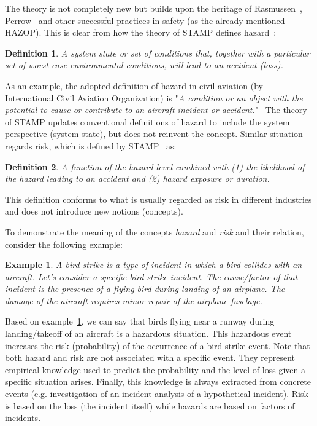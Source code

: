 \documentclass[sw]{iosart2x}
\newtheorem{mydef}{Definition}
\newtheorem{myexample}{Example}
\begin{document}
The theory is not completely new but builds upon the heritage of Rasmussen~\cite{Rasmussen1997}, Perrow~\cite{Perrow1999} and other successful practices in safety (as the already mentioned HAZOP). This is clear from how the theory of STAMP defines hazard~\cite{leveson2012engineering}:
\begin{mydef}
\label{def:hazard}
A system state or set of conditions that, together with a particular set of worst-case environmental conditions, will lead to an accident (loss).
\end{mydef}
As an example, the adopted definition of hazard in civil aviation (by International Civil Aviation Organization) is "\emph{A condition or an object with the potential to cause or contribute to an aircraft incident or accident.}"~\cite{ICAO2018} The theory of STAMP updates conventional definitions of hazard to include the system perspective (system state), but does not reinvent the concept. Similar situation regards risk, which is defined by STAMP~\cite{leveson2012engineering} as:
\begin{mydef}
\label{def:risk}
A function of the hazard level combined with (1) the likelihood of the hazard leading to an accident and (2) hazard exposure or duration.
\end{mydef} 
This definition conforms to what is usually regarded as risk in different industries and does not introduce new notions (concepts). 

To demonstrate the meaning of the concepts \emph{hazard} and \emph{risk} and their relation, consider the following example: 

\begin{myexample}
\label{ex:birdstrike}
A bird strike is a type of incident in which a bird collides with an aircraft. 
Let's consider a specific bird strike incident. The cause/factor of that incident is the presence of a flying bird during landing of an airplane. The damage of the aircraft requires minor repair of the airplane fuselage.
\end{myexample}

Based on example~\ref{ex:birdstrike}, we can say that birds flying near a runway during landing/takeoff of an aircraft is a hazardous situation. This hazardous event increases the risk (probability) of the occurrence of a bird strike event. Note that both hazard and risk are not associated with a specific event. They represent empirical knowledge used to predict the probability and the level of loss given a specific situation arises. Finally, this knowledge is always extracted from concrete events (e.g. investigation of an incident analysis of a hypothetical incident). Risk is based on the loss (the incident itself) while hazards are based on factors of incidents.
\end{document}
